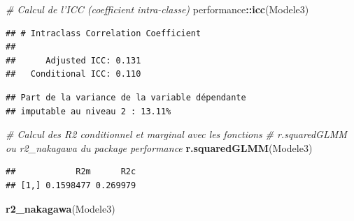 \documentclass[
  11pt,
  french,
]{book}
\makeatletter
\newenvironment{Shaded}{\begin{snugshade}}{\end{snugshade}}
\newcommand{\CharTok}[1]{\textcolor[rgb]{0.31,0.60,0.02}{#1}}
\newcommand{\CommentTok}[1]{\textcolor[rgb]{0.56,0.35,0.01}{\textit{#1}}}
\newcommand{\DataTypeTok}[1]{\textcolor[rgb]{0.13,0.29,0.53}{#1}}
\newcommand{\DecValTok}[1]{\textcolor[rgb]{0.00,0.00,0.81}{#1}}
\newcommand{\KeywordTok}[1]{\textcolor[rgb]{0.13,0.29,0.53}{\textbf{#1}}}
\newcommand{\NormalTok}[1]{#1}
\newcommand{\OperatorTok}[1]{\textcolor[rgb]{0.81,0.36,0.00}{\textbf{#1}}}
\newcommand{\StringTok}[1]{\textcolor[rgb]{0.31,0.60,0.02}{#1}}
\newenvironment{kframe}{%
\medskip{}
\setlength{\fboxsep}{.8em}
 \def\at@end@of@kframe{}%
 \ifinner\ifhmode%
  \def\at@end@of@kframe{\end{minipage}}%
  \begin{minipage}{\columnwidth}%
 \fi\fi%
 \def\FrameCommand##1{\hskip\@totalleftmargin \hskip-\fboxsep
 \colorbox{shadecolor}{##1}\hskip-\fboxsep
     \hskip-\linewidth \hskip-\@totalleftmargin \hskip\columnwidth}%
 \MakeFramed {\advance\hsize-\width
   \@totalleftmargin\z@ \linewidth\hsize
   \@setminipage}}%
 {\par\unskip\endMakeFramed%
 \at@end@of@kframe}
\renewenvironment{Shaded}{\begin{kframe}}{\end{kframe}}
\makeatother
\begin{document}
\begin{Shaded}
\begin{Highlighting}[]
\CommentTok{# Calcul de l'ICC (coefficient intra-classe)}
\NormalTok{performance}\OperatorTok{::}\KeywordTok{icc}\NormalTok{(Modele3)}
\end{Highlighting}
\end{Shaded}

\begin{verbatim}
## # Intraclass Correlation Coefficient
## 
##      Adjusted ICC: 0.131
##   Conditional ICC: 0.110
\end{verbatim}

\begin{Shaded}
\end{Shaded}

\begin{verbatim}
## Part de la variance de la variable dépendante 
## imputable au niveau 2 : 13.11%
\end{verbatim}

\begin{Shaded}
\begin{Highlighting}[]
\CommentTok{# Calcul des R2 conditionnel et marginal avec les fonctions}
\CommentTok{# r.squaredGLMM ou r2_nakagawa du package performance}
\KeywordTok{r.squaredGLMM}\NormalTok{(Modele3)}
\end{Highlighting}
\end{Shaded}

\begin{verbatim}
##            R2m      R2c
## [1,] 0.1598477 0.269979
\end{verbatim}

\begin{Shaded}
\begin{Highlighting}[]
\KeywordTok{r2_nakagawa}\NormalTok{(Modele3)}
\end{Highlighting}
\end{Shaded}
\end{document}
